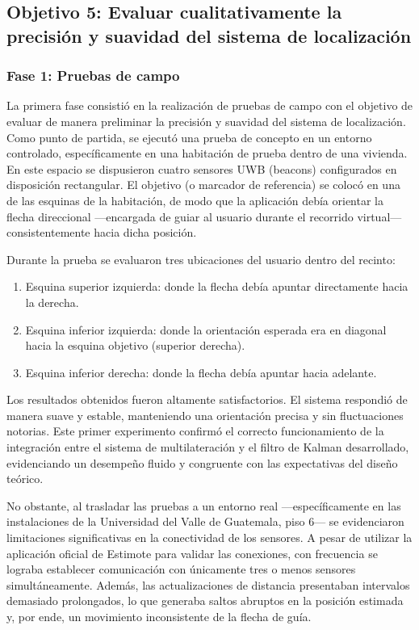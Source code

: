 \subsection{Objetivo 5: Evaluar cualitativamente la precisión y suavidad del sistema de localización}
\subsubsection{Fase 1: Pruebas de campo}

La primera fase consistió en la realización de pruebas de campo con el objetivo de evaluar de manera preliminar la precisión y suavidad del sistema de localización. Como punto de partida, se ejecutó una prueba de concepto en un entorno controlado, específicamente en una habitación de prueba dentro de una vivienda. En este espacio se dispusieron cuatro sensores UWB (beacons) configurados en disposición rectangular. El objetivo (o marcador de referencia) se colocó en una de las esquinas de la habitación, de modo que la aplicación debía orientar la flecha direccional —encargada de guiar al usuario durante el recorrido virtual— consistentemente hacia dicha posición.

Durante la prueba se evaluaron tres ubicaciones del usuario dentro del recinto:
\begin{enumerate}
	\item Esquina superior izquierda: donde la flecha debía apuntar directamente hacia la derecha.
	\item	Esquina inferior izquierda: donde la orientación esperada era en diagonal hacia la esquina objetivo (superior derecha).
	\item	Esquina inferior derecha: donde la flecha debía apuntar hacia adelante.
\end{enumerate}

Los resultados obtenidos fueron altamente satisfactorios. El sistema respondió de manera suave y estable, manteniendo una orientación precisa y sin fluctuaciones notorias. Este primer experimento confirmó el correcto funcionamiento de la integración entre el sistema de multilateración y el filtro de Kalman desarrollado, evidenciando un desempeño fluido y congruente con las expectativas del diseño teórico.

No obstante, al trasladar las pruebas a un entorno real —específicamente en las instalaciones de la Universidad del Valle de Guatemala, piso 6— se evidenciaron limitaciones significativas en la conectividad de los sensores. A pesar de utilizar la aplicación oficial de Estimote para validar las conexiones, con frecuencia se lograba establecer comunicación con únicamente tres o menos sensores simultáneamente. Además, las actualizaciones de distancia presentaban intervalos demasiado prolongados, lo que generaba saltos abruptos en la posición estimada y, por ende, un movimiento inconsistente de la flecha de guía.


